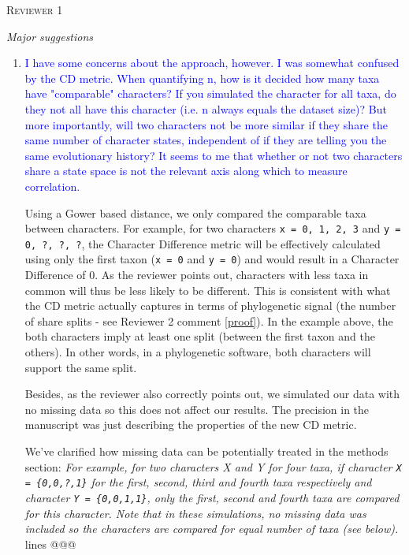 \documentclass[12pt,letterpaper]{article}
\renewcommand{\section}[1]{%
\bigskip
\begin{center}
\begin{Large}
\normalfont\scshape #1
\medskip
\end{Large}
\end{center}}
\renewcommand{\subsection}[1]{%
\bigskip
\begin{center}
\begin{large}
\normalfont\itshape #1
\end{large}
\end{center}}
\begin{document}
%
%


\section{Reviewer 1}

\subsection{Major suggestions}

\begin{enumerate}

\item{\textcolor{blue}{I have some concerns about the approach, however. I was somewhat confused by the CD metric. When quantifying n, how is it decided how many taxa have "comparable" characters?
If you simulated the character for all taxa, do they not all have this character (i.e. n always equals the dataset size)?
But more importantly, will two characters not be more similar if they share the same number of character states, independent of if they are telling you the same evolutionary history?
It seems to me that whether or not two characters share a state space is not the relevant axis along which to measure correlation.}}
\label{gower}

Using a Gower based distance, we only compared the comparable taxa between characters.
For example, for two characters \texttt{x = {0, 1, 2, 3}} and \texttt{y = {0, ?, ?, ?}}, the Character Difference metric will be effectively calculated using only the first taxon (\texttt{x = {0}} and \texttt{y = {0}}) and would result in a Character Difference of 0.
As the reviewer points out, characters with less taxa in common will thus be less likely to be different.
This is consistent with what the CD metric actually captures in terms of phylogenetic signal (the number of share splits - see Reviewer 2 comment \ref{proof}).
In the example above, the both characters imply at least one split (between the first taxon and the others).
In other words, in a phylogenetic software, both characters will support the same split.

Besides, as the reviewer also correctly points out, we simulated our data with no missing data so this does not affect our results.
The precision in the manuscript was just describing the properties of the new CD metric.

We've clarified how missing data can be potentially treated in the methods section:
\textit{For example, for two characters X and Y for four taxa, if character \texttt{X = \{0,0,?,1\}} for the first, second, third and fourth taxa respectively and character \texttt{Y = \{0,0,1,1\}}, only the first, second and fourth taxa are compared for this character.
Note that in these simulations, no missing data was included so the characters are compared for equal number of taxa (see below).} lines @@@


\end{enumerate}
\end{document}
